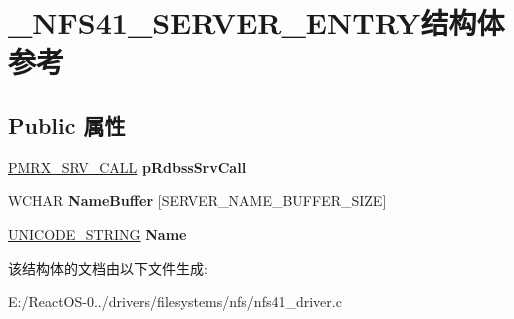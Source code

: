 \hypertarget{struct___n_f_s41___s_e_r_v_e_r___e_n_t_r_y}{}\section{\+\_\+\+N\+F\+S41\+\_\+\+S\+E\+R\+V\+E\+R\+\_\+\+E\+N\+T\+R\+Y结构体 参考}
\label{struct___n_f_s41___s_e_r_v_e_r___e_n_t_r_y}
\subsection*{Public 属性}
\begin{DoxyCompactItemize}
\item 
\mbox{\label{struct___n_f_s41___s_e_r_v_e_r___e_n_t_r_y_a6b91edd40a39fae55729e7bce7d87f72}} 
\hyperlink{struct___m_r_x___s_r_v___c_a_l_l__}{P\+M\+R\+X\+\_\+\+S\+R\+V\+\_\+\+C\+A\+LL} {\bfseries p\+Rdbss\+Srv\+Call}
\item 
\mbox{\label{struct___n_f_s41___s_e_r_v_e_r___e_n_t_r_y_af797dce3eec43e906ac27de3ff94692e}} 
W\+C\+H\+AR {\bfseries Name\+Buffer} \mbox{[}S\+E\+R\+V\+E\+R\+\_\+\+N\+A\+M\+E\+\_\+\+B\+U\+F\+F\+E\+R\+\_\+\+S\+I\+ZE\mbox{]}
\item 
\mbox{\label{struct___n_f_s41___s_e_r_v_e_r___e_n_t_r_y_a08f173413d35282877724926f094e8b4}} 
\hyperlink{struct___u_n_i_c_o_d_e___s_t_r_i_n_g}{U\+N\+I\+C\+O\+D\+E\+\_\+\+S\+T\+R\+I\+NG} {\bfseries Name}
\end{DoxyCompactItemize}


该结构体的文档由以下文件生成\+:\begin{DoxyCompactItemize}
\item 
E\+:/\+React\+O\+S-\/0../drivers/filesystems/nfs/nfs41\+\_\+driver.\+c\end{DoxyCompactItemize}
